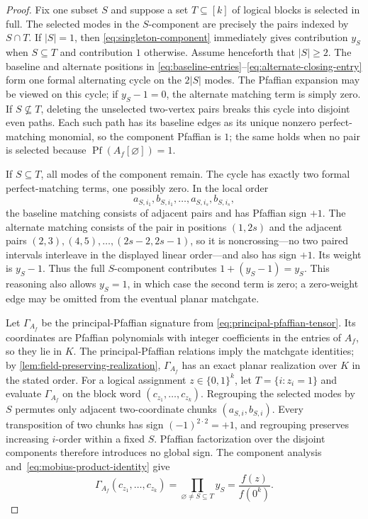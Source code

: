 \documentclass[11pt]{article}
\theoremstyle{definition}
\theoremstyle{remark}
\newcommand{\bits}{\{0,1\}}
\newcommand{\Pf}{\operatorname{Pf}}
\begin{document}
\begin{proof}
Fix one subset $S$ and suppose a set $T\subseteq[k]$ of logical blocks is
selected in full.  The selected modes in the $S$-component are precisely
the pairs indexed by $S\cap T$.  If $|S|=1$, then
\eqref{eq:singleton-component} immediately gives contribution $y_S$ when
$S\subseteq T$ and contribution $1$ otherwise.  Assume henceforth that
$|S|\ge2$.  The baseline and alternate positions in
\eqref{eq:baseline-entries}--\eqref{eq:alternate-closing-entry} form one
formal alternating cycle on the $2|S|$ modes.  The Pfaffian expansion may
be viewed on this cycle; if $y_S-1=0$, the alternate matching term is
simply zero.  If $S\nsubseteq T$,
deleting the unselected two-vertex pairs breaks this cycle into disjoint
even paths.  Each such path has its baseline edges as its unique nonzero
perfect-matching monomial, so the component Pfaffian is $1$; the same holds
when no pair is selected because $\Pf(A_f[\varnothing])=1$.

If $S\subseteq T$, all modes of the component remain.  The cycle has
exactly two formal perfect-matching terms, one possibly zero.  In the local order
\[
  a_{S,i_1},b_{S,i_1},\ldots,a_{S,i_s},b_{S,i_s},
\]
the baseline matching consists of adjacent pairs and has Pfaffian sign
$+1$.  The alternate matching consists of the pair in positions $(1,2s)$
and the adjacent pairs $(2,3),(4,5),\ldots,(2s-2,2s-1)$, so it is
noncrossing---no two paired intervals interleave in the displayed linear
order---and also has sign $+1$.  Its weight is $y_S-1$.  Thus the full
$S$-component contributes $1+(y_S-1)=y_S$.  This reasoning also allows
$y_S=1$, in which case the second term is zero; a zero-weight edge may be
omitted from the eventual planar matchgate.

Let $\Gamma_{A_f}$ be the principal-Pfaffian signature from
\eqref{eq:principal-pfaffian-tensor}.  Its coordinates are Pfaffian
polynomials with integer coefficients in the entries of $A_f$, so they lie
in $K$.  The principal-Pfaffian relations imply the matchgate identities;
by \cref{lem:field-preserving-realization}, $\Gamma_{A_f}$ has an exact
planar realization over $K$ in the stated order.  For a logical assignment
$z\in\bits^k$, let $T=\{i:z_i=1\}$ and evaluate $\Gamma_{A_f}$ on the block
word $(c_{z_1},\ldots,c_{z_k})$.  Regrouping the selected modes by $S$
permutes only adjacent two-coordinate chunks $(a_{S,i},b_{S,i})$.  Every
transposition of two chunks has sign $(-1)^{2\cdot2}=+1$, and regrouping
preserves increasing $i$-order within a fixed $S$.  Pfaffian factorization
over the disjoint components therefore introduces no global sign.  The
component analysis and~\eqref{eq:mobius-product-identity} give
\begin{equation}
  \Gamma_{A_f}(c_{z_1},\ldots,c_{z_k})
  =\prod_{\varnothing\ne S\subseteq T}y_S
  =\frac{f(z)}{f(0^k)}.
  \label{eq:pfaffian-interpolation-normalized}
\end{equation}


\end{proof}
\end{document}
